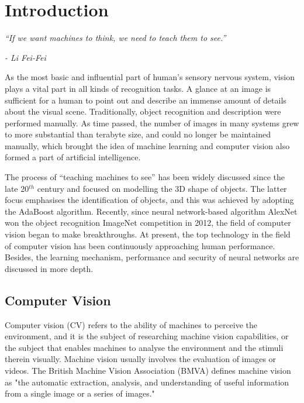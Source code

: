 \chapter{Introduction}
\label{cha:intro}

\epigraph{\textit{``If we want machines to think, we need to teach them to see.''}}{\textit{- Li Fei-Fei}}

As the most basic and influential part of human's sensory nervous system, vision plays a vital part in all kinds of recognition tasks. A glance at an image is sufficient for a human to point out and describe an immense amount of details about the visual scene. Traditionally, object recognition and description were performed manually. As time passed, the number of images in many systems grew to more substantial than terabyte size, and could no longer be maintained manually, which brought the idea of machine learning and computer vision also formed a part of artificial intelligence. 

The process of ``teaching machines to see'' has been widely discussed since the late 20$^{th}$ century and focused on modelling the 3D shape of objects. The latter focus emphasises the identification of objects, and this was achieved by adopting the AdaBoost \cite{adaboost} algorithm. Recently, since neural network-based algorithm AlexNet \cite{alexnet} won the object recognition ImageNet \cite{imagenet} competition in 2012, the field of computer vision began to make breakthroughs. At present, the top technology in the field of computer vision has been continuously approaching human performance. Besides, the learning mechanism, performance and security of neural networks are discussed in more depth.

\section{Computer Vision}

Computer vision (CV) refers to the ability of machines to perceive the environment, and it is the subject of researching machine vision capabilities, or the subject that enables machines to analyse the environment and the stimuli therein visually. Machine vision usually involves the evaluation of images or videos. The British Machine Vision Association (BMVA) defines machine vision as "the automatic extraction, analysis, and understanding of useful information from a single image or a series of images." \cite{bmva}


